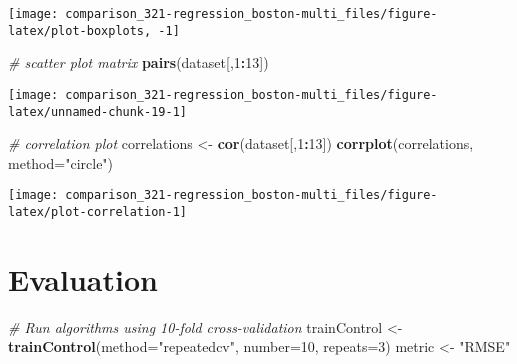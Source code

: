 \documentclass[]{book}
\newenvironment{Shaded}{\begin{snugshade}}{\end{snugshade}}
\newcommand{\CommentTok}[1]{\textcolor[rgb]{0.56,0.35,0.01}{\textit{#1}}}
\newcommand{\DataTypeTok}[1]{\textcolor[rgb]{0.13,0.29,0.53}{#1}}
\newcommand{\DecValTok}[1]{\textcolor[rgb]{0.00,0.00,0.81}{#1}}
\newcommand{\KeywordTok}[1]{\textcolor[rgb]{0.13,0.29,0.53}{\textbf{#1}}}
\newcommand{\NormalTok}[1]{#1}
\newcommand{\OperatorTok}[1]{\textcolor[rgb]{0.81,0.36,0.00}{\textbf{#1}}}
\newcommand{\StringTok}[1]{\textcolor[rgb]{0.31,0.60,0.02}{#1}}
\begin{document}
\begin{center}\texttt{[image: comparison\_321-regression\_boston-multi\_files/figure-latex/plot-boxplots, -1]} \end{center}

\begin{Shaded}
\begin{Highlighting}[]
\CommentTok{# scatter plot matrix}
\KeywordTok{pairs}\NormalTok{(dataset[,}\DecValTok{1}\OperatorTok{:}\DecValTok{13}\NormalTok{])}
\end{Highlighting}
\end{Shaded}

\begin{center}\texttt{[image: comparison\_321-regression\_boston-multi\_files/figure-latex/unnamed-chunk-19-1]} \end{center}

\begin{Shaded}
\begin{Highlighting}[]
\CommentTok{# correlation plot}
\NormalTok{correlations <-}\StringTok{ }\KeywordTok{cor}\NormalTok{(dataset[,}\DecValTok{1}\OperatorTok{:}\DecValTok{13}\NormalTok{])}
\KeywordTok{corrplot}\NormalTok{(correlations, }\DataTypeTok{method=}\StringTok{"circle"}\NormalTok{)}
\end{Highlighting}
\end{Shaded}

\begin{center}\texttt{[image: comparison\_321-regression\_boston-multi\_files/figure-latex/plot-correlation-1]} \end{center}

\hypertarget{evaluation}{%
\section{Evaluation}\label{evaluation}}

\begin{Shaded}
\begin{Highlighting}[]
\CommentTok{# Run algorithms using 10-fold cross-validation}
\NormalTok{trainControl <-}\StringTok{ }\KeywordTok{trainControl}\NormalTok{(}\DataTypeTok{method=}\StringTok{"repeatedcv"}\NormalTok{, }\DataTypeTok{number=}\DecValTok{10}\NormalTok{, }\DataTypeTok{repeats=}\DecValTok{3}\NormalTok{)}
\NormalTok{metric <-}\StringTok{ "RMSE"}
\end{Highlighting}
\end{Shaded}
\end{document}
